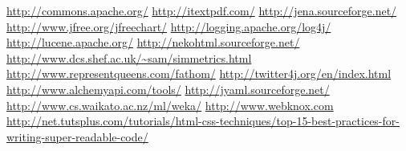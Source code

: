 \documentclass[a4paper,twoside]{article}      %
\begin{document}
\begin{thebibliography}{99}
 \url{http://commons.apache.org/}
 \url{http://itextpdf.com/}
 \url{http://jena.sourceforge.net/}
 \url{http://www.jfree.org/jfreechart/}
 \url{http://logging.apache.org/log4j/}
 \url{http://lucene.apache.org/}
 \url{http://nekohtml.sourceforge.net/}
 \url{http://www.dcs.shef.ac.uk/~sam/simmetrics.html}
 \url{http://www.representqueens.com/fathom/}
 \url{http://twitter4j.org/en/index.html}
 \url{http://www.alchemyapi.com/tools/}
 \url{http://jyaml.sourceforge.net/}
 \url{http://www.cs.waikato.ac.nz/ml/weka/}
 \url{http://www.webknox.com}
 \url{http://net.tutsplus.com/tutorials/html-css-techniques/top-15-best-practices-for-writing-super-readable-code/}
\end{thebibliography}
\end{document}

